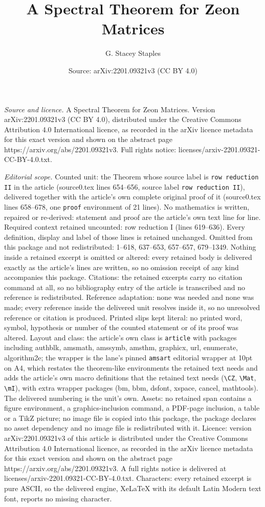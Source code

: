 \documentclass[10pt,a4paper]{amsart}
\title[A Spectral Theorem for Zeon Matrices]{A Spectral Theorem for Zeon Matrices}
\author{G. Stacey Staples}
\date{Source: arXiv:2201.09321v3 (CC BY 4.0)}
\begin{document}
\maketitle

\noindent\emph{Source and licence.} A Spectral Theorem for Zeon Matrices. Version arXiv:2201.09321v3 (CC BY 4.0), distributed under the Creative Commons Attribution 4.0 International licence, as recorded in the arXiv licence metadata for this exact version and shown on the abstract page https://arxiv.org/abs/2201.09321v3. Full rights notice: licenses/arxiv-2201.09321-CC-BY-4.0.txt.\par\smallskip

\noindent\textit{Editorial scope.} Counted unit: the Theorem whose source label is \texttt{row reduction II} in the article (source0.tex lines 654--656, source label \texttt{row reduction II}), delivered together with the article's own complete original proof of it (source0.tex lines 658--678, one \texttt{proof} environment of 21 lines). No mathematics is written, repaired or re-derived: statement and proof are the article's own text line for line. Required context retained uncounted: row reduction I (lines 619--636). Every definition, display and label of those lines is retained unchanged. Omitted from this package and not redistributed: 1--618, 637--653, 657--657, 679--1349. Nothing inside a retained excerpt is omitted or altered: every retained body is delivered exactly as the article's lines are written, so no omission receipt of any kind accompanies this package. Citations: the retained excerpts carry no citation command at all, so no bibliography entry of the article is transcribed and no reference is redistributed. Reference adaptation: none was needed and none was made; every reference inside the delivered unit resolves inside it, so no unresolved reference or citation is produced. Printed slips kept literal: no printed word, symbol, hypothesis or number of the counted statement or of its proof was altered. Layout and class: the article's own class is \texttt{article} with packages including authblk, amsmath, amssymb, amsthm, graphicx, url, enumerate, algorithm2e; the wrapper is the lane's pinned \texttt{amsart} editorial wrapper at 10pt on A4, which restates the theorem-like environments the retained text needs and adds the article's own macro definitions that the retained text needs (\texttt{\textbackslash CZ}, \texttt{\textbackslash Mat}, \texttt{\textbackslash mI}), with extra wrapper packages (bm, bbm, dsfont, xspace, cancel, mathtools). The delivered numbering is the unit's own. Assets: no retained span contains a figure environment, a graphics-inclusion command, a PDF-page inclusion, a table or a TikZ picture; no image file is copied into this package, the package declares no asset dependency and no image file is redistributed with it. Licence: version arXiv:2201.09321v3 of this article is distributed under the Creative Commons Attribution 4.0 International licence, as recorded in the arXiv licence metadata for this exact version and shown on the abstract page https://arxiv.org/abs/2201.09321v3. A full rights notice is delivered at licenses/arxiv-2201.09321-CC-BY-4.0.txt. Characters: every retained excerpt is pure ASCII, so the delivered engine, XeLaTeX with its default Latin Modern text font, reports no missing character.
\end{document}
